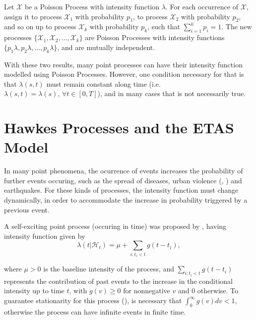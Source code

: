 \begin{theorem}
  \label{teo-thinning}
  Let $\mathcal{X}$ be a Poisson Process with intensity function $\lambda$. For each occurrence of $\mathcal{X}$, assign it to process $\mathcal{X}_{1}$ with probability $p_{1}$, to process $\mathcal{X}_{2}$ with probability $p_{2}$, and so on up to process $\mathcal{X}_{k}$ with probability $p_{k}$, such that $\sum_{i=1}^{k}p_{i} = 1$. The new processes $\{\mathcal{X}_{1},\mathcal{X}_{2},\ldots, \mathcal{X}_{k}\}$ are Poisson Processes with intensity functions $\{p_{1}\lambda, p_{2}\lambda, \ldots, p_{k}\lambda\}$, and are mutually independent.
\end{theorem}

With these two results, many point processes can have their intensity function modelled using Poisson Processes. However, one condition necessary for that is that $\lambda(s,t)$ must remain constant along time (i.e. $\lambda(s,t) = \lambda(s),\, \forall t \in [0,T]$), and in many cases that is not necessarily true.

\section{Hawkes Processes and the ETAS Model}
\label{sec-hawkes_proc}

In many point phenomena, the ocurrence of events increases the probability of further events occuring, such as the spread of diseases, urban violence (, ) and earthquakes. For these kinds of processes, the intensity function must change dynamically, in order to accommodate the increase in probability triggered by a previous event.

A self-exciting point process (occuring in time) was proposed by , having intensity function given by
\begin{equation}
  \label{eq-hawkes-uni}
  \lambda(t|\mathcal{H}_{t}) = \mu + \sum_{i:t_{i} < t}g(t - t_{i}),
\end{equation}

\noindent where $\mu > 0$ is the baseline intensity of the process, and $\sum_{i:t_{i} < t}g(t - t_{i})$ represents the contribution of past events to the increase in the conditional intensity up to time $t$, with $g(v) \ge 0$ for nonnegative $v$ and 0 otherwise. To guarantee stationarity for this process (), is necessary that $\int_{0}^{\infty}g(v)dv < 1$, otherwise the process can have infinite events in finite time.

